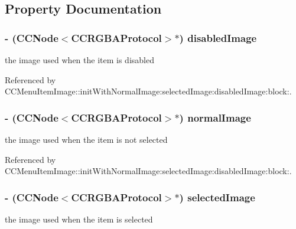 \subsection{Property Documentation}
\hypertarget{class_c_c_menu_item_sprite_aade8cdc45d22eeb8217b354f7ecf7992}{
\subsubsection[{disabled\-Image}]{\setlength{\rightskip}{0pt plus 5cm}-\/ ({\bf C\-C\-Node}$<${\bf C\-C\-R\-G\-B\-A\-Protocol}$>$$\ast$) {\bf disabled\-Image}}}\label{class_c_c_menu_item_sprite_aade8cdc45d22eeb8217b354f7ecf7992}
the image used when the item is disabled 

Referenced by C\-C\-Menu\-Item\-Image\-::init\-With\-Normal\-Image\-:selected\-Image\-:disabled\-Image\-:block\-:.

\hypertarget{class_c_c_menu_item_sprite_ae38e27f26826c36a351d0edec8531265}{
\subsubsection[{normal\-Image}]{\setlength{\rightskip}{0pt plus 5cm}-\/ ({\bf C\-C\-Node}$<${\bf C\-C\-R\-G\-B\-A\-Protocol}$>$$\ast$) {\bf normal\-Image}}}\label{class_c_c_menu_item_sprite_ae38e27f26826c36a351d0edec8531265}
the image used when the item is not selected 

Referenced by C\-C\-Menu\-Item\-Image\-::init\-With\-Normal\-Image\-:selected\-Image\-:disabled\-Image\-:block\-:.

\hypertarget{class_c_c_menu_item_sprite_ac171832023f58cbc07e532d4b19513b7}{
\subsubsection[{selected\-Image}]{\setlength{\rightskip}{0pt plus 5cm}-\/ ({\bf C\-C\-Node}$<${\bf C\-C\-R\-G\-B\-A\-Protocol}$>$$\ast$) {\bf selected\-Image}}}\label{class_c_c_menu_item_sprite_ac171832023f58cbc07e532d4b19513b7}
the image used when the item is selected 

